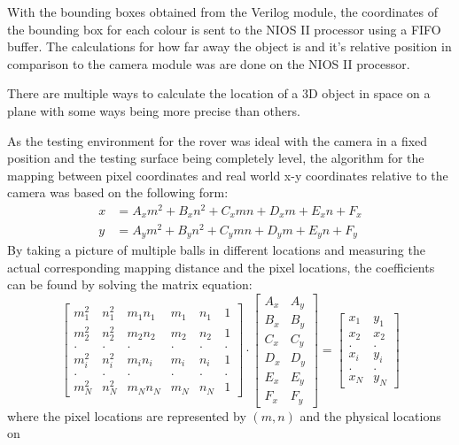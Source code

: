 \documentclass[a4paper]{article}
\begin{document}
With the bounding boxes obtained from the Verilog module, the coordinates of the
bounding box for each colour is sent to the NIOS II processor using a FIFO buffer.
The calculations for how far away the object is and it's relative position in 
comparison to the camera module was are done on the NIOS II processor. 

There are multiple ways to calculate the location of a 3D object in space on a plane
with some ways being more precise than others. 


As the testing environment for the rover was ideal with the camera in a fixed 
position and the testing surface being completely level, the algorithm 
for the mapping between pixel coordinates and real world x-y coordinates relative
to the camera was based on the following form: \begin{align*}
    x & = A_x m^2 + B_x n^2 + C_x mn + D_x m + E_x n + F_x \\
    y & = A_y m^2 + B_y n^2 + C_y mn + D_y m + E_y n + F_y  
\end{align*} By taking a picture of multiple balls in different locations and 
measuring the actual corresponding mapping distance and the pixel locations, the
coefficients can be found by solving the matrix equation: $$
    \begin{bmatrix}
        m^2_1 & n^2_1 & m_1n_1 & m_1 & n_1 & 1 \\
        m^2_2 & n^2_2 & m_2n_2 & m_2 & n_2 & 1 \\
        .     & .     &    .   &  .  & .   & . \\
        m^2_i & n^2_i & m_in_i & m_i & n_i & 1 \\  
        .     & .     &    .   &  .  & .   & . \\
        m^2_N & n^2_N & m_Nn_N & m_N & n_N & 1  
    \end{bmatrix}
    \cdot
    \begin{bmatrix}
        A_x & A_y \\
        B_x & B_y \\
        C_x & C_y \\
        D_x & D_y \\
        E_x & E_y \\
        F_x & F_y
    \end{bmatrix}
    =
    \begin{bmatrix}
        x_1 & y_1 \\
        x_2 & x_2 \\
        . & . \\
        x_i & y_i \\
        . & . \\
        x_N & y_N
    \end{bmatrix}
$$ where the pixel locations are represented by \((m,n)\) and the physical locations on
\end{document}
